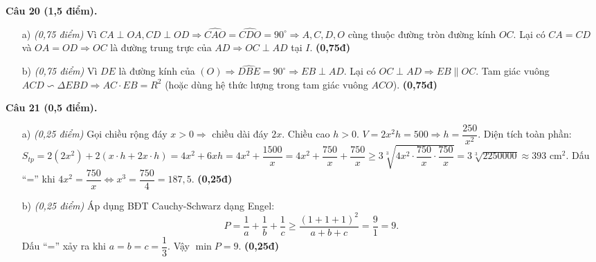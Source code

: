 \documentclass[11pt,a4paper]{article}
\begin{document}
\vspace{1mm}
\textbf{Câu 20 (1,5 điểm).}
\begin{itemize}
  \item[a)] \textit{(0,75 điểm)} Vì $CA \perp OA, CD \perp OD \Rightarrow \widehat{CAO} = \widehat{CDO} = 90^\circ \Rightarrow A, C, D, O$ cùng thuộc đường tròn đường kính $OC$. Lại có $CA = CD$ và $OA = OD \Rightarrow OC$ là đường trung trực của $AD \Rightarrow OC \perp AD$ tại $I$. \hfill \textbf{(0,75đ)}
  \item[b)] \textit{(0,75 điểm)} Vì $DE$ là đường kính của $(O) \Rightarrow \widehat{DBE} = 90^\circ \Rightarrow EB \perp AD$. Lại có $OC \perp AD \Rightarrow EB \parallel OC$. Tam giác vuông $ACD \backsim \Delta EBD \Rightarrow AC \cdot EB = R^2$ (hoặc dùng hệ thức lượng trong tam giác vuông $ACO$). \hfill \textbf{(0,75đ)}
\end{itemize}

\vspace{1mm}
\textbf{Câu 21 (0,5 điểm).}
\begin{itemize}
  \item[a)] \textit{(0,25 điểm)} Gọi chiều rộng đáy $x > 0 \Rightarrow$ chiều dài đáy $2x$. Chiều cao $h > 0$. $V = 2x^2 h = 500 \Rightarrow h = \dfrac{250}{x^2}$. Diện tích toàn phần:
  $S_{tp} = 2(2x^2) + 2(x \cdot h + 2x \cdot h) = 4x^2 + 6xh = 4x^2 + \dfrac{1500}{x} = 4x^2 + \dfrac{750}{x} + \dfrac{750}{x} \ge 3\sqrt[3]{4x^2 \cdot \dfrac{750}{x} \cdot \dfrac{750}{x}} = 3\sqrt[3]{2250000} \approx 393\text{ cm}^2$. Dấu ``='' khi $4x^2 = \dfrac{750}{x} \Leftrightarrow x^3 = \dfrac{750}{4} = 187{,}5$. \hfill \textbf{(0,25đ)}
  \item[b)] \textit{(0,25 điểm)} Áp dụng BĐT Cauchy-Schwarz dạng Engel:
  \[
  P = \dfrac{1}{a} + \dfrac{1}{b} + \dfrac{1}{c} \ge \dfrac{(1+1+1)^2}{a+b+c} = \dfrac{9}{1} = 9.
  \]
  Dấu ``='' xảy ra khi $a = b = c = \dfrac{1}{3}$. Vậy $\min P = 9$. \hfill \textbf{(0,25đ)}
\end{itemize}
\end{document}
